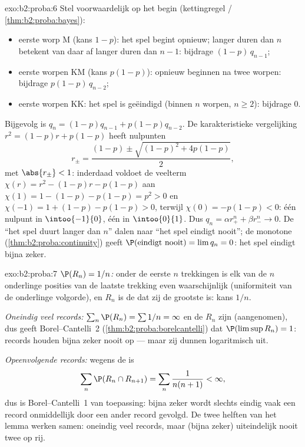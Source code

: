 \begin{solution}{exo:b2:proba:6}
Stel voorwaardelijk op het begin (kettingregel /
\cref{thm:b2:proba:bayes}):
\begin{itemize}
\item eerste worp M (kans $1 - p$): het spel begint opnieuw; langer
duren dan $n$ betekent van daar af langer duren dan $n - 1$:
bijdrage $(1-p)\,q_{n-1}$;
\item eerste worpen KM (kans $p(1-p)$): opnieuw beginnen na twee
worpen: bijdrage $p(1-p)\,q_{n-2}$;
\item eerste worpen KK: het spel is geëindigd (binnen $n$ worpen,
$n \geq 2$): bijdrage $0$.
\end{itemize}
Bijgevolg is $q_n = (1-p)q_{n-1} + p(1-p)q_{n-2}$. De
karakteristieke vergelijking $r^2 = (1-p)r + p(1-p)$ heeft
nulpunten
\[
r_\pm = \frac{(1-p) \pm \sqrt{(1-p)^2 + 4p(1-p)}}{2},
\]
met $\abs{r_\pm} < 1$: inderdaad voldoet de veelterm $\chi(r) = r^2
- (1-p)r - p(1-p)$ aan $\chi(1) = 1 - (1-p) - p(1-p) = p^2 > 0$ en
$\chi(-1) = 1 + (1-p) - p(1-p) > 0$, terwijl $\chi(0) = -p(1-p) <
0$: één nulpunt in $\intoo{-1}{0}$, één in $\intoo{0}{1}$. Dus $q_n
= \alpha r_+^n + \beta r_-^n \to 0$. De  ``het spel
duurt langer dan $n$'' dalen naar ``het spel eindigt nooit''; de
monotone  (\cref{thm:b2:proba:continuity}) geeft
$\P(\text{eindigt nooit}) = \lim q_n = 0$: het spel eindigt bijna
zeker.
\end{solution}

\begin{solution}{exo:b2:proba:7}
\emph{$\P(R_n) = 1/n$:} onder de eerste $n$ trekkingen is elk van
de $n$ onderlinge posities van de laatste trekking even
waarschijnlijk (uniformiteit van de onderlinge volgorde), en $R_n$
is de  dat zij de grootste is: kans $1/n$.

\emph{Oneindig veel records:} $\sum_n \P(R_n) = \sum 1/n = \infty$
en de $R_n$ zijn  (aangenomen), dus geeft
Borel--Cantelli~2 (\cref{thm:b2:proba:borelcantelli}) dat
$\P(\limsup R_n) = 1$: records houden bijna zeker nooit op --- maar
zij dunnen logaritmisch uit.

\emph{Opeenvolgende records:} wegens de  is
\[
\sum_n \P(R_n \cap R_{n+1})
= \sum_n \frac{1}{n(n+1)} < \infty ,
\]
dus is Borel--Cantelli~1 van toepassing: bijna zeker wordt slechts
eindig vaak een record onmiddellijk door een ander record gevolgd.
De twee helften van het lemma werken samen: oneindig veel records,
maar (bijna zeker) uiteindelijk nooit twee op rij.
\end{solution}

